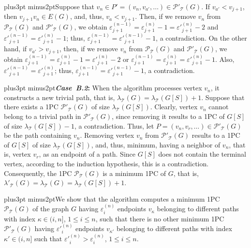 \documentclass[10pt]{article}
\def\yskip{\penalty-50\vskip3pt plus3pt minus2pt}
\def\y{\yskip}
\begin{document}
{\y Suppose that $v_n \in P'=(v_n, v_{a'}, \ldots) \in
\mathcal{P'_{\mathcal{T}}}(G)$. If $v_{a'}<v_{j+1}$, then
$v_{j+1}v_n \in E(G)$, and, thus, $v_a<v_{j+1}$. Then, if we
remove $v_n$ from $\mathcal{P_{\mathcal{T}}}(G)$ and
$\mathcal{P'_{\mathcal{T}}}(G)$, we obtain
$\varepsilon^{(n-1)}_{j+1}=\varepsilon^{(n)}_{j+1}-1=\varepsilon'^{(n)}_{j+1}-2$
and $\varepsilon'^{(n-1)}_{j+1}=\varepsilon'^{(n)}_{j+1}-1$; thus,
$\varepsilon^{(n-1)}_{j+1}=\varepsilon'^{(n-1)}_{j+1}-1$, a
contradiction. On the other hand, if $v_{a'}>v_{j+1}$, then, if we
remove $v_n$ from $\mathcal{P_{\mathcal{T}}}(G)$ and
$\mathcal{P'_{\mathcal{T}}}(G)$, we obtain
$\varepsilon^{(n-1)}_{j+1}=\varepsilon^{(n)}_{j+1}-1=\varepsilon'^{(n)}_{j+1}-2$
or
$\varepsilon^{(n-1)}_{j+1}=\varepsilon^{(n)}_{j+1}=\varepsilon'^{(n)}_{j+1}-1$.
Also, $\varepsilon'^{(n-1)}_{j+1}=\varepsilon'^{(n)}_{j+1}$; thus,
$\varepsilon^{(n-1)}_{j+1}=\varepsilon'^{(n-1)}_{j+1}-1$, a
contradiction.

\y {\bf \textit{Case~B.2}:} When the algorithm processes vertex
$v_n$, it constructs a new trivial path, that is,
$\lambda_\mathcal{T}(G)=\lambda_\mathcal{T}(G[S])+1$. Suppose that
there exists a 1PC $\mathcal{P'_{\mathcal{T}}}(G)$ of size
$\lambda_\mathcal{T}(G[S])$. Clearly, vertex $v_n$ cannot belong
to a trivial path in $\mathcal{P'_{\mathcal{T}}}(G)$, since
removing it results to a 1PC of $G[S]$ of size
$\lambda_\mathcal{T}(G[S])-1$, a contradiction. Thus, let $P=(v_n,
v_r, \ldots) \in \mathcal{P'_{\mathcal{T}}}(G)$ be the path
containing $v_n$. Removing vertex $v_n$ from
$\mathcal{P'_{\mathcal{T}}}(G)$ results to a 1PC of $G[S]$ of size
$\lambda_\mathcal{T}(G[S])$, and, thus, minimum, having a neighbor
of $v_n$, that is, vertex $v_r$, as an endpoint of a path. Since
$G[S]$ does not contain the terminal vertex, according to the
induction hypothesis, this is a contradiction. Consequently, the
1PC $\mathcal{P_{\mathcal{T}}}(G)$ is a minimum 1PC of $G$, that
is,
$\lambda'_\mathcal{T}(G)=\lambda_\mathcal{T}(G)=\lambda_\mathcal{T}(G[S])+1$.


\y We show that the algorithm computes a minimum 1PC
$\mathcal{P_{\mathcal{T}}}(G)$ of the graph $G$ having
$\varepsilon^{(n)}_i$ endpoints $v_\kappa$ belonging to different
paths with index $\kappa \in (i,n]$, $1 \leq i \leq n$, such that
there is no other minimum 1PC $\mathcal{P'_{\mathcal{T}}}(G)$
having $\varepsilon'^{(n)}_i$ endpoints $v_{\kappa'}$ belonging to
different paths with index $\kappa' \in (i,n]$ such that
$\varepsilon'^{(n)}_i>\varepsilon^{(n)}_i$, $1 \leq i \leq n$.

}
\end{document}
